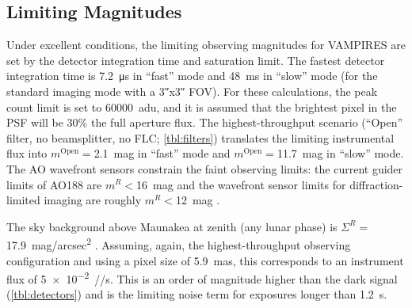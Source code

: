 \subsection{Limiting Magnitudes}

Under excellent conditions, the limiting observing magnitudes for VAMPIRES are set by the detector integration time and saturation limit. The fastest detector integration time is \SI{7.2}{\micro\second} in ``fast'' mode and \SI{48}{\milli\second} in ``slow'' mode (for the standard imaging mode with a \ang{;;3}x\ang{;;3} FOV). For these calculations, the peak count limit is set to \SI{60000}{adu}, and it is assumed that the brightest pixel in the PSF will be 30\% the full aperture flux. The highest-throughput scenario (``Open'' filter, no beamsplitter, no FLC; \autoref{tbl:filters}) translates the limiting instrumental flux into $m^\mathrm{Open}=$\SI{2.1}{mag} in ``fast'' mode and $m^\mathrm{Open}=$\SI{11.7}{mag} in ``slow'' mode. The AO wavefront sensors constrain the faint observing limits: the current guider limits of AO188 are $m^R<$\SI{16}{mag} and the wavefront sensor limits for diffraction-limited imaging are roughly $m^R<$\SI{12}{mag} \citep{minowa_performance_2010}.

The sky background above Maunakea at zenith (any lunar phase) is $\Sigma^R=$\SI{17.9}{mag/arcsec^2} \citep{roth_measurements_2016}. Assuming, again, the highest-throughput observing configuration and using a pixel size of \SI{5.9}{mas}, this corresponds to an instrument flux of \SI{5e-2}{\electron/\pixel/\second}. This is an order of magnitude higher than the dark signal (\autoref{tbl:detectors}) and is the limiting noise term for exposures longer than \SI{1.2}{\second}.
